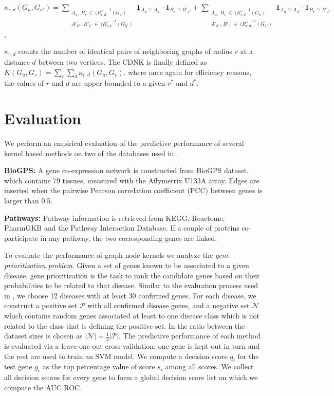 \documentclass{esannV2}
\begin{document}
\begin{center}
 $\kappa_{r,d}(G_u,G_{u'}) = \!\!\!\!\!\!\!\!\!\!\!\!
 \sum\limits_{\substack {A_u,\ {B}_{v} \ \in \ ({R_{r,d}^{\wedge}}^{ -1}(G_u) \\ A'_{u'},\ {B'}_{v'} \ \in \ ({R_{r,d}^{\wedge}}^{ -1}(G_{u'}) }} \!\!\!\!\!\!\!\!\!\!\!\!
  { \textbf{1}_{A_u \cong A_{u'}} \cdot { \textbf{1}_{B_{v} \cong B'_{v'}}}}
+ \!\!\!\!\!\!\!\!\!\!\!\!
 \sum\limits_{\substack {A_u,\ {B}_{v} \ \in \ ({R_{r,d}^{\vee}}^{ -1}(G_u) \\
  A'_{u'},\ {B'}_{v'} \ \in \ ({R_{r,d}^{\vee}}^{ -1}(G_{u'}) }} \!\!\!\!\!\!\!\!\!\!\!\!
  { \textbf{1}_{A_u \cong A_{u'}} \cdot { \textbf{1}_{B_{v} \cong B'_{v'}}}}
  $,
\end{center}
$\kappa_{r,d}$ counts the number of identical pairs of neighboring graphs of radius $r$ at a distance $d$ between two vertices. The CDNK is finally defined as 
$K(G_u,G_v) = \sum\limits_{r}{\sum\limits_{d}{\kappa_{r,d}(G_u,G_v)}}.$
where once again for efficiency reasons,
the values of $r$ and $d$ are upper bounded to a given $r^*$ and $d^*$.

\section{Evaluation}
\label{evaluation}
We perform an empirical evaluation of the predictive performance of several kernel based methods on two of the databases used in \cite{medk}.

\textbf{BioGPS:} A gene co-expression network is constructed from BioGPS dataset, which contains 79 tissues, measured with the Affymetrix U133A array. Edges are inserted when the pairwise Pearson correlation coefficient (PCC) between genes is larger than 0.5.

\textbf{Pathways:} Pathway information is retrieved from KEGG, Reactome, PharmGKB and the Pathway Interaction Database. If a couple of proteins co-participate in any pathway, the two corresponding genes are linked.  

To evaluate the performance of graph node kernels we analyze the {\em gene
prioritization problem}. Given a set of genes known to be associated to a
given disease, gene prioritization is the task to rank the candidate genes
based on their probabilities to be related to that disease. Similar to the
evaluation process used in \cite{medk}, we choose 12 diseases with at least 30
confirmed genes. For each disease, we construct a positive set $\mathcal{P}$
with all confirmed disease genes, and a negative set $\mathcal{N}$ which
contains random genes associated at least to one disease class which is not
related to the class that is defining the positive set. In \cite{medk} the
ratio between the dataset sizes is chosen as $\vert \mathcal{N} \vert =
\frac{1}{2} \vert \mathcal{P} \vert$. 
The predictive performance of each method is evaluated via a leave-one-out
cross validation: one gene is kept out in turn and the rest
are used to train an SVM model. 
We compute a decision score $q_i$ for the
test gene $g_i$ as the top percentage value of score $s_i$ among all scores.
We collect all decision scores for every gene to
form a global decision score list on which we compute the AUC ROC.
\end{document}
